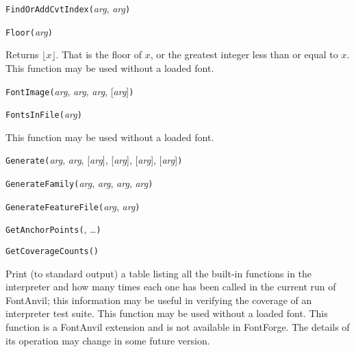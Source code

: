 

\texttt{FindOrAddCvtIndex(}\textit{arg}, \textit{arg}\texttt{)}



\texttt{Floor(}\textit{arg}\texttt{)}

Returns $\lfloor x \rfloor$.  That is the floor of $x$, or the greatest
integer less than or equal to $x$.  This function may be used without a
loaded font.



\texttt{FontImage(}\textit{arg}, \textit{arg}, \textit{arg}, [\textit{arg}]\texttt{)}



\texttt{FontsInFile(}\textit{arg}\texttt{)}

This function may be used without a loaded font.



\texttt{Generate(}\textit{arg}, \textit{arg}, [\textit{arg}], [\textit{arg}], [\textit{arg}], [\textit{arg}]\texttt{)}



\texttt{GenerateFamily(}\textit{arg}, \textit{arg}, \textit{arg}, \textit{arg}\texttt{)}



\texttt{GenerateFeatureFile(}\textit{arg}, \textit{arg}\texttt{)}



\texttt{GetAnchorPoints(}, \ldots\texttt{)}



\texttt{GetCoverageCounts()}

Print (to standard output) a table listing all the built-in functions in the
interpreter and how many times each one has been called in the current run
of FontAnvil; this information may be useful in verifying the coverage of an
interpreter test suite.
This function may be used without a loaded font.  This \FFdiff function is a
FontAnvil extension and is not available in FontForge.  The details of its
operation may change in some future version.

